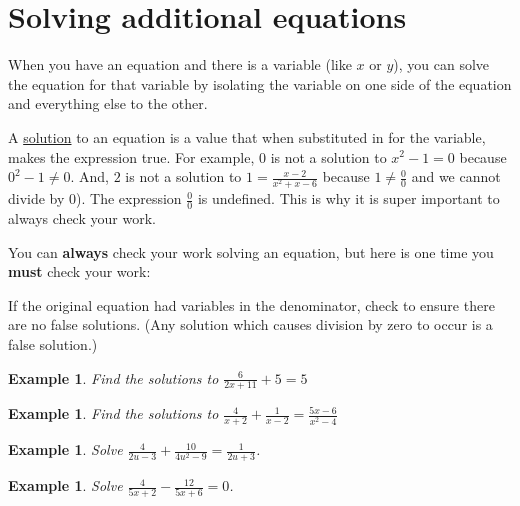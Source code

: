 \documentclass[twoside]{tufte-handout}
\newcommand{\booksection}{0}
\newcommand{\pageheader}{}
\newcounter{ekcounter}%
\theoremstyle{ekimcustom}
\newtheorem{exm}[ekcounter]{Example}
\begin{document}
\renewcommand{\booksection}{Solving additional equations}
\renewcommand{\pageheader}{\booksection }
\section*{\LARGE \pageheader}

When you have an equation and there is a variable (like $x$ or $y$), you can solve the equation for that variable by isolating the variable on one side of the equation and everything else to the other.  

A {\underline{solution}} to an equation is a value that when substituted in for the variable, makes the expression true. For example, $0$ is not a solution to $x^2-1=0$ because $0^2-1\neq0$. And,  $2$ is not a solution to $1=\frac{x-2}{x^2+x-6}$ because $1\neq \frac{0}{0}$ and we cannot divide by $0$).  The expression $\frac{0}{0}$ is undefined.  This is why it is super important to always check your work. 

You can {\bf always} check your work solving an equation, but here is one time you {\bf must} check your work:
\begin{bhabit}{}{}
If the original equation had variables in the denominator, check to ensure there are no false solutions. (Any solution which causes division by zero to occur is a false solution.)
\end{bhabit}


\everymath{\displaystyle}
\begin{exm}{Find the solutions to $\frac{6}{2x+11}+5=5$}
\end{exm}\vskip10pt

\begin{exm}{Find the solutions to $ \frac{4}{x+2}+\frac{1}{x-2}=\frac{5x-6}{x^2-4} $}
\end{exm}\vskip10pt



\everymath{\displaystyle}
\begin{exm}{Solve $\frac{4}{2u-3}+\frac{10}{4u^2-9}=\frac{1}{2u+3}$.}
\end{exm}\vskip10pt

\begin{exm}{Solve $\frac{4}{5x+2}-\frac{12}{5x+6}=0$.}
\end{exm}\vskip10pt
\end{document}
